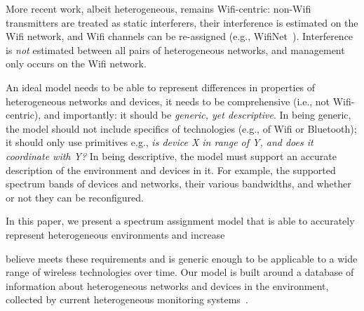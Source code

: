 


More recent work, albeit heterogeneous, remains Wifi-centric: non-Wifi transmitters are treated as static interferers, their interference is estimated on the Wifi network, and Wifi channels can be re-assigned (e.g., WifiNet~\cite{wifinet}).  Interference is \emph{not} estimated between all pairs of heterogeneous networks, and management only occurs on the Wifi network.

An ideal model needs to be able to represent differences in properties of heterogeneous networks and devices, it needs to be comprehensive (i.e., not Wifi-centric), and importantly: it should be \emph{generic, yet descriptive}.  In being generic, the model should not include specifics of technologies (e.g., of Wifi or Bluetooth); it should only use primitives e.g., \emph{is device X in range of Y, and does it coordinate with Y?}  In being descriptive, the model must support an accurate description of the environment and devices in it.  For example, the supported spectrum bands of devices and networks, their various bandwidths, and whether or not they can be reconfigured.

In this paper, we present a spectrum assignment model that is able to accurately represent heterogeneous environments and increase 

 believe meets these requirements and is generic enough to be applicable to a wide range of wireless technologies over time.  Our model is built around a database of information about heterogeneous networks and devices in the environment, collected by current heterogeneous monitoring systems~\cite{airshark,dof,rfdump,wifinet}.

%
%
%

